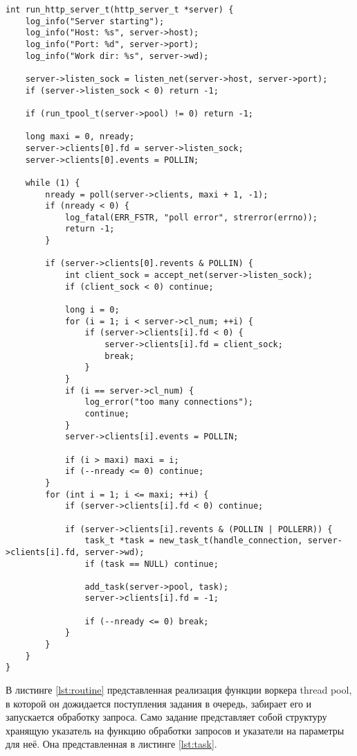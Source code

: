 \begin{center}
\captionsetup{justification=raggedright,singlelinecheck=off}
\begin{lstlisting}[label=lst:run,caption=Запуск сервера]
int run_http_server_t(http_server_t *server) {
	log_info("Server starting");
	log_info("Host: %s", server->host);
	log_info("Port: %d", server->port);
	log_info("Work dir: %s", server->wd);
	
	server->listen_sock = listen_net(server->host, server->port);
	if (server->listen_sock < 0) return -1;
	
	if (run_tpool_t(server->pool) != 0) return -1;
	
	long maxi = 0, nready;
	server->clients[0].fd = server->listen_sock;
	server->clients[0].events = POLLIN;
	
	while (1) {
		nready = poll(server->clients, maxi + 1, -1);
		if (nready < 0) {
			log_fatal(ERR_FSTR, "poll error", strerror(errno));
			return -1;
		}
		
		if (server->clients[0].revents & POLLIN) {
			int client_sock = accept_net(server->listen_sock);
			if (client_sock < 0) continue;
			
			long i = 0;
			for (i = 1; i < server->cl_num; ++i) {
				if (server->clients[i].fd < 0) {
					server->clients[i].fd = client_sock;
					break;
				}
			}
			if (i == server->cl_num) {
				log_error("too many connections");
				continue;
			}
			server->clients[i].events = POLLIN;
			
			if (i > maxi) maxi = i;
			if (--nready <= 0) continue;
		}
		for (int i = 1; i <= maxi; ++i) {
			if (server->clients[i].fd < 0) continue;
			
			if (server->clients[i].revents & (POLLIN | POLLERR)) {
				task_t *task = new_task_t(handle_connection, server->clients[i].fd, server->wd);
				if (task == NULL) continue;
				
				add_task(server->pool, task);
				server->clients[i].fd = -1;
				
				if (--nready <= 0) break;
			}
		}
	}
}
\end{lstlisting}
\end{center}
\FloatBarrier

В листинге \ref{lst:routine} представленная реализация функции воркера thread pool, в которой он дожидается поступления задания в очередь, забирает его и запускается обработку запроса. Само задание представляет собой структуру хранящую указатель на функцию обработки запросов и указатели на параметры для неё. Она представленная в листинге \ref{lst:task}.

